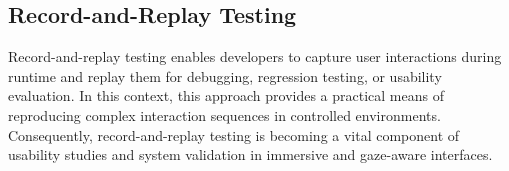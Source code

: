 \subsection{Record-and-Replay Testing}

Record-and-replay testing enables developers to capture user interactions during runtime and replay them for debugging, regression testing, or usability evaluation\cite{vasquez2018continuous, moran2016automatically}. In this context, this approach provides a practical means of reproducing complex interaction sequences in controlled environments. Consequently, record-and-replay testing is becoming a vital component of usability studies and system validation in immersive and gaze-aware interfaces.


